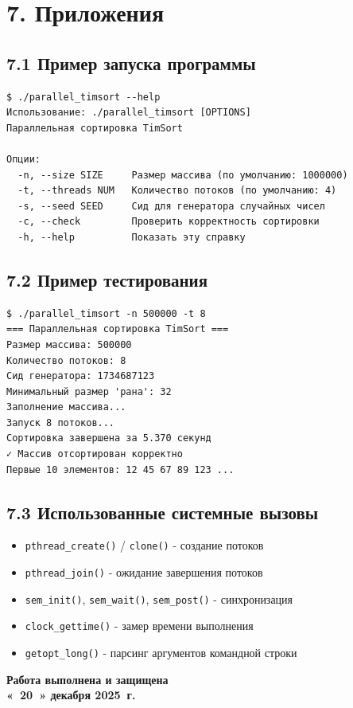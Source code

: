 \documentclass[12pt,a4paper]{article}
\begin{document}
\section*{7. Приложения}

\subsection*{7.1 Пример запуска программы}
\begin{verbatim}
$ ./parallel_timsort --help
Использование: ./parallel_timsort [OPTIONS]
Параллельная сортировка TimSort

Опции:
  -n, --size SIZE     Размер массива (по умолчанию: 1000000)
  -t, --threads NUM   Количество потоков (по умолчанию: 4)
  -s, --seed SEED     Сид для генератора случайных чисел
  -c, --check         Проверить корректность сортировки
  -h, --help          Показать эту справку
\end{verbatim}

\subsection*{7.2 Пример тестирования}
\begin{verbatim}
$ ./parallel_timsort -n 500000 -t 8
=== Параллельная сортировка TimSort ===
Размер массива: 500000
Количество потоков: 8
Сид генератора: 1734687123
Минимальный размер 'рана': 32
Заполнение массива...
Запуск 8 потоков...
Сортировка завершена за 5.370 секунд
✓ Массив отсортирован корректно
Первые 10 элементов: 12 45 67 89 123 ...
\end{verbatim}

\subsection*{7.3 Использованные системные вызовы}
\begin{itemize}
    \item \texttt{pthread\_create()} / \texttt{clone()} - создание потоков
    \item \texttt{pthread\_join()} - ожидание завершения потоков
    \item \texttt{sem\_init()}, \texttt{sem\_wait()}, \texttt{sem\_post()} - синхронизация
    \item \texttt{clock\_gettime()} - замер времени выполнения
    \item \texttt{getopt\_long()} - парсинг аргументов командной строки
\end{itemize}

\vspace{1cm}

\begin{center}
    \textbf{Работа выполнена и защищена} \\
    \textbf{«~20~» декабря 2025~г.}
\end{center}
\end{document}
